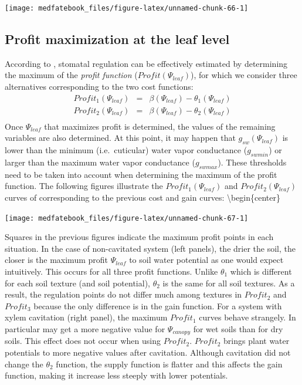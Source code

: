 \documentclass[]{book}
\begin{document}
\begin{center}\texttt{[image: medfatebook\_files/figure-latex/unnamed-chunk-66-1]} \end{center}

\hypertarget{profit-maximization-at-the-leaf-level}{%
\subsection{Profit maximization at the leaf level}\label{profit-maximization-at-the-leaf-level}}

According to \citet{Sperry2016}, stomatal regulation can be effectively estimated by determining the maximum of the \emph{profit function} (\(Profit(\Psi_{leaf})\)), for which we consider three alternatives corresponding to the two cost functions:
\begin{eqnarray}
Profit_1(\Psi_{leaf}) &=& \beta(\Psi_{leaf})-\theta_1(\Psi_{leaf})\\
Profit_2(\Psi_{leaf}) &=& \beta(\Psi_{leaf})-\theta_2(\Psi_{leaf})\\
\end{eqnarray}
Once \(\Psi_{leaf}\) that maximizes profit is determined, the values of the remaining variables are also determined. At this point, it may happen that \(g_{sw}(\Psi_{leaf})\) is lower than the minimum (i.e.~cuticular) water vapor conductance (\(g_{swmin}\)) or larger than the maximum water vapor conductance (\(g_{swmax}\)). These thresholds need to be taken into account when determining the maximum of the profit function. The following figures illustrate the \(Profit_1(\Psi_{leaf})\) and \(Profit_2(\Psi_{leaf})\) curves of corresponding to the previous cost and gain curves:
\textbackslash{}begin\{center\}

\begin{center}\texttt{[image: medfatebook\_files/figure-latex/unnamed-chunk-67-1]} \end{center}

Squares in the previous figures indicate the maximum profit points in each situation. In the case of non-cavitated system (left panels), the drier the soil, the closer is the maximum profit \(\Psi_{leaf}\) to soil water potential as one would expect intuitively. This occurs for all three profit functions. Unlike \(\theta_1\) which is different for each soil texture (and soil potential), \(\theta_2\) is the same for all soil textures. As a result, the regulation points do not differ much among textures in \(Profit_2\) and \(Profit_3\) because the only difference is in the gain function. For a system with xylem cavitation (right panel), the maximum \(Profit_1\) curves behave strangely. In particular may get a more negative value for \(\Psi_{canopy}\) for wet soils than for dry soils. This effect does not occur when using \(Profit_2\). \(Profit_2\) brings plant water potentials to more negative values after cavitation. Although cavitation did not change the \(\theta_2\) function, the supply function is flatter and this affects the gain function, making it increase less steeply with lower potentials.
\end{document}
